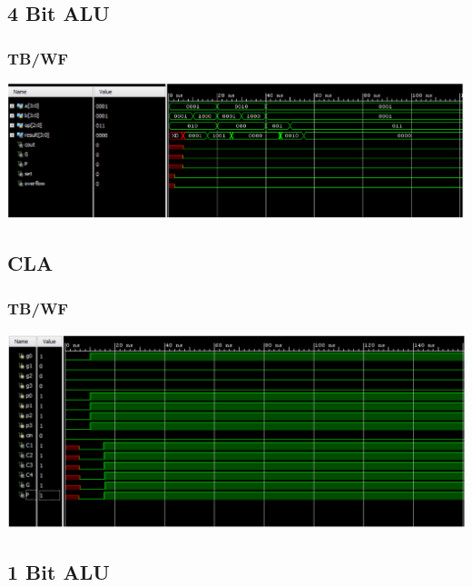 \documentclass{llncs}
\begin{document}
\subsection{4 Bit ALU}
\label{alu3}
\begin{addmargin}[-5em]{-6em}

\end{addmargin}
\subsubsection{TB/WF}
\begin{addmargin}[-5em]{-6em}

\end{addmargin}
\includegraphics[scale=.2]{images/4bitaluTB.png}


\subsection{CLA}
\label{cla:1}
\begin{addmargin}[-5em]{-6em}
  
\end{addmargin}

\subsubsection{TB/WF}
\begin{addmargin}[-5em]{-6em}
  
\end{addmargin}
\includegraphics[scale=.2]{images/claWave.png}
\subsection{1 Bit ALU}
\label{1alu:1}
\begin{addmargin}[-5em]{-6em}
  
\end{addmargin}
\end{document}
